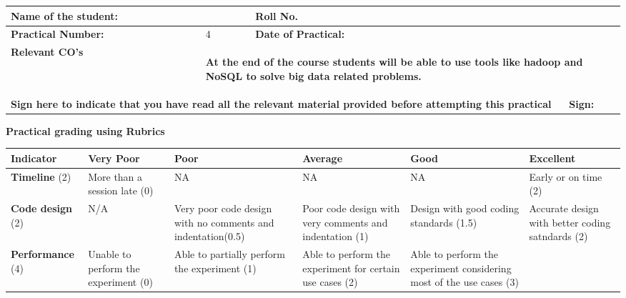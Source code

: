 \documentclass[11pt,article]{memoir}
\begin{document}
\sloppy
\fancypage{\doublebox}{}
\begin{flushleft}


    \begin{tabular}{ | p{4cm} | p{5cm} | p{3.5cm} | p{2cm} |}
    \hline

    \textbf{Name of the student:}& &\textbf{Roll No.} & \\ \hline
    \textbf{Practical Number:}& 4 & \textbf{Date of Practical:} & \\ \hline
	\textbf{Relevant CO's} & \multicolumn{3}{|p{10.5cm}|}{\begin{flushleft}
	\textbf{At the end of the course students will be able to use tools like hadoop and NoSQL to solve big data related problems.}
	\end{flushleft}}\\
    \hline
    \multicolumn{3}{|p{12.5cm}|}{\textbf{Sign here to indicate that you have read all the relevant material provided before attempting this practical}}& \textbf{Sign:}\\ \hline
    \end{tabular}
    \vspace{1cm}
        \textbf{Practical grading using Rubrics}
                  \begin{tabular}{|p{2cm}|p{2cm}|p{2cm}|p{2cm}|p{2cm}|p{2cm}|}
                  \hline \textbf{Indicator} & \textbf{Very Poor} & \textbf{Poor} & \textbf{Average} & \textbf{Good} & \textbf{Excellent} \\ 
                  \hline \textbf{Timeline} (2) & More than a session late (0) & NA  & NA & NA  & Early or on time (2) \\ 
                  \hline \textbf{Code design} (2) & N/A & Very poor code design with no comments and indentation(0.5) & Poor code design with very comments and indentation
                  (1) & Design with good coding standards (1.5) & Accurate design with better coding satndards (2) \\ 
                  \hline \textbf{Performance} (4) & Unable to
                  perform the
                  experiment
                  (0) & Able to
                  partially
                  perform the
                  experiment
                  (1)
                   & Able to
                   perform the
                   experiment
                   for certain use
                   cases (2) & Able to
                   perform the
                   experiment
                   considering
                   most of the
                   use cases (3)

\end{tabular}
\end{flushleft}
\end{document}
